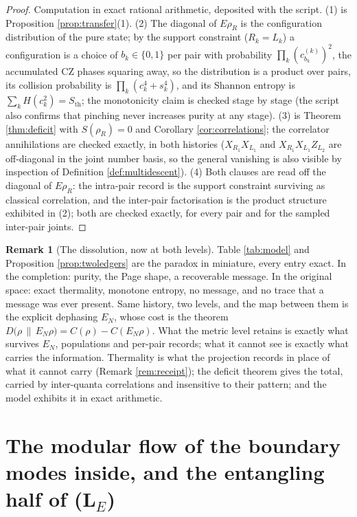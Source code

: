 \documentclass[11pt]{article}
\theoremstyle{definition}
\newtheorem{remark}[theorem]{Remark}
\newcommand{\Sth}{S_{\mathrm{th}}}
\newcommand{\EN}{E_{N}}
\newcommand{\rel}[2]{D\bigl(#1 \,\|\, #2\bigr)}
\begin{document}
\begin{proof}
Computation in exact rational arithmetic, deposited with the script. (1) is Proposition \ref{prop:transfer}(1). (2) The diagonal of $E\rho_R$ is the configuration distribution of the pure state; by the support constraint ($R_k = L_k$) a configuration is a choice of $b_k \in \{0,1\}$ per pair with probability $\prod_k (c^{(k)}_{b_k})^2$, the accumulated CZ phases squaring away, so the distribution is a product over pairs, its collision probability is $\prod_k (c_k^4 + s_k^4)$, and its Shannon entropy is $\sum_k H(c_k^2) = \Sth$; the monotonicity claim is checked stage by stage (the script also confirms that pinching never increases purity at any stage). (3) is Theorem \ref{thm:deficit} with $S(\rho_R) = 0$ and Corollary \ref{cor:correlations}; the correlator annihilations are checked exactly, in both histories ($X_{R_1}X_{L_1}$ and $X_{R_1}X_{L_1}Z_{L_2}$ are off-diagonal in the joint number basis, so the general vanishing is also visible by inspection of Definition \ref{def:multidescent}). (4) Both clauses are read off the diagonal of $E\rho_R$: the intra-pair record is the support constraint surviving as classical correlation, and the inter-pair factorisation is the product structure exhibited in (2); both are checked exactly, for every pair and for the sampled inter-pair joints.
\end{proof}

\begin{remark}[The dissolution, now at both levels]\label{rem:bothledgers}
Table \ref{tab:model} and Proposition \ref{prop:twoledgers} are the paradox in miniature, every entry exact. In the completion: purity, the Page shape, a recoverable message. In the original space: exact thermality, monotone entropy, no message, and no trace that a message was ever present. Same history, two levels, and the map between them is the explicit dephasing $\EN$, whose cost is the theorem $\rel{\rho}{\EN\rho} = C(\rho) - C(\EN\rho)$. What the metric level retains is exactly what survives $\EN$, populations and per-pair records; what it cannot see is exactly what carries the information. Thermality is what the projection records in place of what it cannot carry (Remark \ref{rem:receipt}); the deficit theorem gives the total, carried by inter-quanta correlations and insensitive to their pattern; and the model exhibits it in exact arithmetic.
\end{remark}

\section{The modular flow of the boundary modes inside, and the entangling half of (L$_E$)}\label{sec:flowinside}
\end{document}
